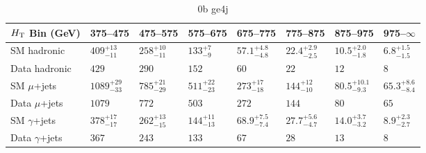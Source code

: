 \documentclass[8pt]{article}
\def\scalht{\mbox{$H_{\rm{T}}$}\xspace}
\newcommand\T{\rule{0pt}{2.6ex}}
\newcommand\B{\rule[-1.2ex]{0pt}{0pt}}
\begin{document}
\begin{table}[ht!]
\caption{0b ge4j}
\label{tab:ensemble-0b ge4j}
\centering
\begin{tabular}{ llllllll }

\hline
\scalht Bin (GeV)       & 375--475                       & 475--575                       & 575--675                       & 675--775                       & 775--875                       & 875--975                       & 975--$\infty$                  \\ [1.000000ex]
\hline
SM hadronic\T           & $409^{+13}_{-11}$              & $258^{+10}_{-11}$              & $133^{+7}_{-9}$                & $57.1^{+4.8}_{-4.8}$           & $22.4^{+2.9}_{-2.5}$           & $10.5^{+2.0}_{-1.8}$           & $6.8^{+1.5}_{-1.5}$            \\ 
Data hadronic\B         & $429$                          & $290$                          & $152$                          & $60$                           & $22$                           & $12$                           & $8$                            \\ 
\hline
SM $\mu$+jets\T         & $1089^{+29}_{-33}$             & $785^{+21}_{-29}$              & $511^{+22}_{-23}$              & $273^{+17}_{-18}$              & $144^{+12}_{-10}$              & $80.5^{+10.1}_{-9.3}$          & $65.3^{+8.6}_{-8.4}$           \\ 
Data $\mu$+jets\B       & $1079$                         & $772$                          & $503$                          & $272$                          & $144$                          & $80$                           & $65$                           \\ 
\hline
SM $\gamma$+jets\T      & $378^{+17}_{-17}$              & $262^{+13}_{-15}$              & $144^{+11}_{-13}$              & $68.9^{+7.5}_{-7.4}$           & $27.7^{+5.6}_{-4.7}$           & $14.0^{+3.7}_{-3.2}$           & $8.9^{+2.3}_{-2.7}$            \\ 
Data $\gamma$+jets\B    & $367$                          & $243$                          & $133$                          & $67$                           & $28$                           & $13$                           & $8$                            \\ 
\hline

\end{tabular}
\end{table}
\end{document}

